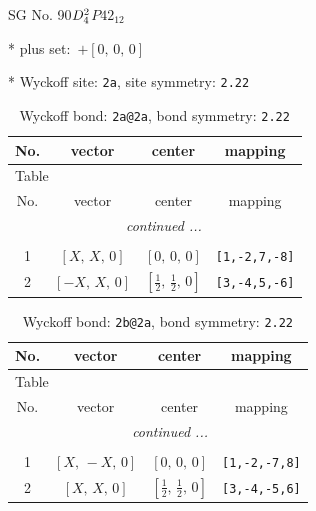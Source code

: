 \documentclass[fleqn,8pt]{jsarticle}
\begin{document}
\setcounter{MaxMatrixCols}{32}

\renewcommand{\tablename}{Table~}
\renewcommand{\figurename}{Figure~}
\begin{center}
\LARGE
SG No. 90\quad$D_{\rm 4}^{2}$\quad$P42_12$\quad[ tetragonal ]
\end{center}

* plus set:\,\,\,$+\left[ 0,\, 0,\, 0 \right]$


* Wyckoff site: {\tt 2a}, site symmetry: {\tt 2.22}
\renewcommand{\arraystretch}{1.2}
\begin{longtable}{cccc}
\caption{Wyckoff bond: {\tt 2a@2a}, bond symmetry: {\tt 2.22}}
 \\
 \hline \hline
No. & vector & center & mapping \\ \hline \endfirsthead

\multicolumn{3}{l}{\tablename\ \thetable{}} \\
 \hline \hline
No. & vector & center & mapping \\ \hline \endhead

 \hline \hline
\multicolumn{3}{r}{\footnotesize\it continued ...} \\ \endfoot

 \hline \hline
\multicolumn{3}{r}{} \\ \endlastfoot

1 & $\left[ X,\, X,\, 0 \right]$ & $\left[ 0,\, 0,\, 0 \right]$ & {\tt [1,-2,7,-8]} \\ \hline
2 & $\left[ - X,\, X,\, 0 \right]$ & $\left[ \frac{1}{2},\, \frac{1}{2},\, 0 \right]$ & {\tt [3,-4,5,-6]} \\
\end{longtable}
\renewcommand{\arraystretch}{1.2}
\begin{longtable}{cccc}
\caption{Wyckoff bond: {\tt 2b@2a}, bond symmetry: {\tt 2.22}}
 \\
 \hline \hline
No. & vector & center & mapping \\ \hline \endfirsthead

\multicolumn{3}{l}{\tablename\ \thetable{}} \\
 \hline \hline
No. & vector & center & mapping \\ \hline \endhead

 \hline \hline
\multicolumn{3}{r}{\footnotesize\it continued ...} \\ \endfoot

 \hline \hline
\multicolumn{3}{r}{} \\ \endlastfoot

1 & $\left[ X,\, - X,\, 0 \right]$ & $\left[ 0,\, 0,\, 0 \right]$ & {\tt [1,-2,-7,8]} \\ \hline
2 & $\left[ X,\, X,\, 0 \right]$ & $\left[ \frac{1}{2},\, \frac{1}{2},\, 0 \right]$ & {\tt [3,-4,-5,6]} \\
\end{longtable}
\end{document}
